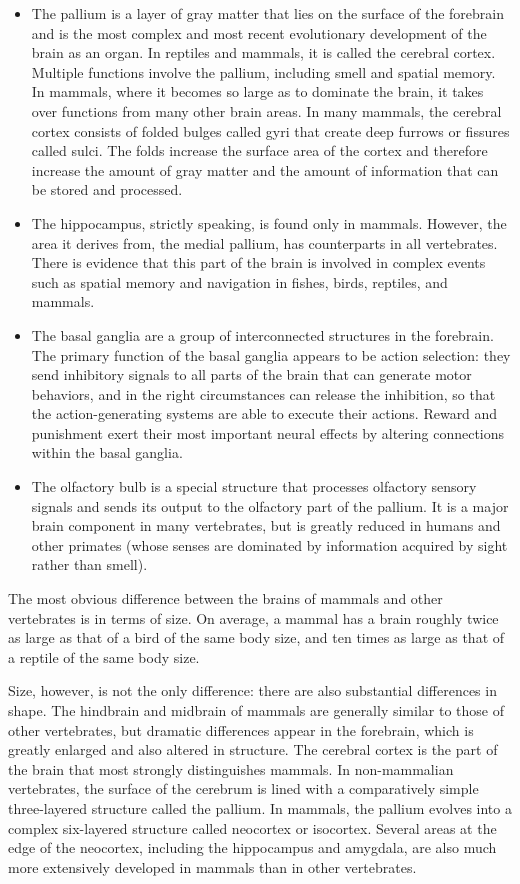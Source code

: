 \begin{itemize}
\item
  The pallium is a layer of gray matter that lies on the surface of the forebrain and is the most complex and most recent evolutionary development of the brain as an organ. In reptiles and mammals, it is called the cerebral cortex. Multiple functions involve the pallium, including smell and spatial memory. In mammals, where it becomes so large as to dominate the brain, it takes over functions from many other brain areas. In many mammals, the cerebral cortex consists of folded bulges called gyri that create deep furrows or fissures called sulci. The folds increase the surface area of the cortex and therefore increase the amount of gray matter and the amount of information that can be stored and processed.
\item
  The hippocampus, strictly speaking, is found only in mammals. However, the area it derives from, the medial pallium, has counterparts in all vertebrates. There is evidence that this part of the brain is involved in complex events such as spatial memory and navigation in fishes, birds, reptiles, and mammals.
\item
  The basal ganglia are a group of interconnected structures in the forebrain. The primary function of the basal ganglia appears to be action selection: they send inhibitory signals to all parts of the brain that can generate motor behaviors, and in the right circumstances can release the inhibition, so that the action-generating systems are able to execute their actions. Reward and punishment exert their most important neural effects by altering connections within the basal ganglia.
\item
  The olfactory bulb is a special structure that processes olfactory sensory signals and sends its output to the olfactory part of the pallium. It is a major brain component in many vertebrates, but is greatly reduced in humans and other primates (whose senses are dominated by information acquired by sight rather than smell).
\end{itemize}

The most obvious difference between the brains of mammals and other vertebrates is in terms of size. On average, a mammal has a brain roughly twice as large as that of a bird of the same body size, and ten times as large as that of a reptile of the same body size.

Size, however, is not the only difference: there are also substantial differences in shape. The hindbrain and midbrain of mammals are generally similar to those of other vertebrates, but dramatic differences appear in the forebrain, which is greatly enlarged and also altered in structure. The cerebral cortex is the part of the brain that most strongly distinguishes mammals. In non-mammalian vertebrates, the surface of the cerebrum is lined with a comparatively simple three-layered structure called the pallium. In mammals, the pallium evolves into a complex six-layered structure called neocortex or isocortex. Several areas at the edge of the neocortex, including the hippocampus and amygdala, are also much more extensively developed in mammals than in other vertebrates.

